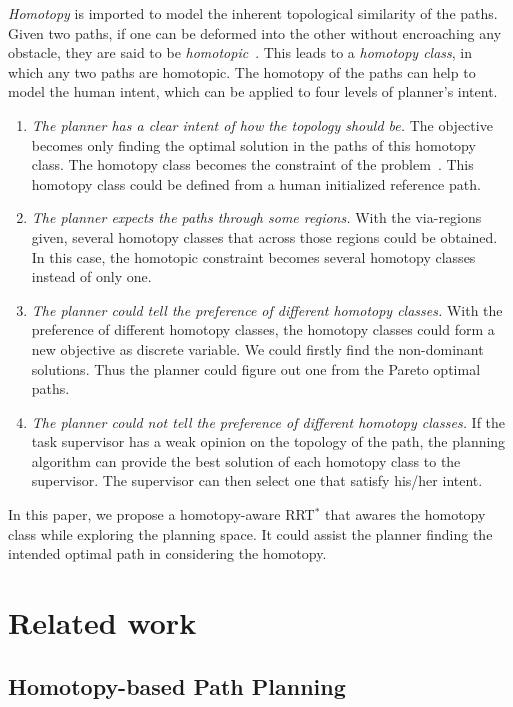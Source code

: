 \documentclass[letterpaper, 10 pt, conference]{ieeeconf}
\begin{document}
\emph{Homotopy} is imported to model the inherent topological similarity of the paths.
Given two paths, if one can be deformed into the other without encroaching any obstacle, they are said to be \emph{homotopic}~\cite{Hernandez201544}.
This leads to a \emph{homotopy class}, in which any two paths are homotopic.
The homotopy of the paths can help to model the human intent, which can be applied to four levels of planner's intent.
\begin{enumerate}
\item \emph{The planner has a clear intent of how the topology should be.}
The objective becomes only finding the optimal solution in the paths of this homotopy class.
The homotopy class becomes the constraint of the problem~\cite{Hershberger199463}.
This homotopy class could be defined from a human initialized reference path.
\item \emph{The planner expects the paths through some regions.}
With the via-regions given, several homotopy classes that across those regions could be obtained.
In this case, the homotopic constraint becomes several homotopy classes instead of only one.

\item \emph{The planner could tell the preference of different homotopy classes.}
With the preference of different homotopy classes, the homotopy classes could form a new objective as discrete variable.
We could firstly find the non-dominant solutions.
Thus the planner could figure out one from the Pareto optimal paths.
\item \emph{The planner could not tell the preference of different homotopy classes.}
If the task supervisor has a weak opinion on the topology of the path, the planning algorithm can provide the best solution of each homotopy class to the supervisor.
The supervisor can then select one that satisfy his/her intent.
\end{enumerate}

In this paper, we propose a homotopy-aware RRT$^{*}$ that awares the homotopy class while exploring the planning space.
It could assist the planner finding the intended optimal path in considering the homotopy.

\section{Related work}
\label{sec:related_work}

\subsection{Homotopy-based Path Planning}
\end{document}
